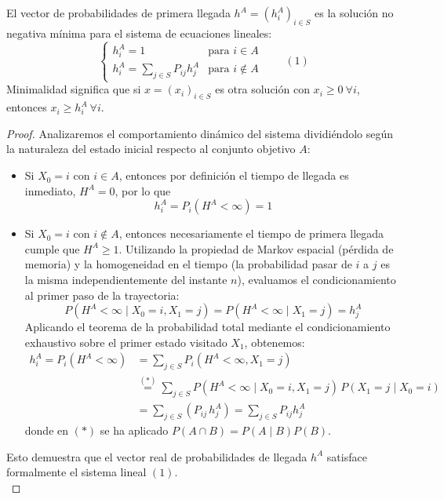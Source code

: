 \documentclass[10pt]{book}
\begin{document}
\begin{teo}
    El vector de probabilidades de primera llegada $h^A = (h_i^A)_{i \in S}$ es la solución no negativa mínima para el sistema de ecuaciones lineales:
    \[
    \begin{cases} 
        h_i^A = 1 & \text{para } i \in A \\ 
        h_i^A = \sum\limits_{j \in S} P_{ij} h_j^A & \text{para } i \notin A 
    \end{cases} \qquad (1)
    \]
    Minimalidad significa que si $x = (x_i)_{i \in S}$ es otra solución con $x_i \geq 0 \ \forall i$, entonces $x_i \geq h_i^A \ \forall i$.
\begin{proof}
    Analizaremos el comportamiento dinámico del sistema dividiéndolo según la naturaleza del estado inicial respecto al conjunto objetivo $A$:
    \begin{itemize}
        \item Si $X_0 = i$ con $i \in A$, entonces por definición el tiempo de llegada es inmediato, $H^A = 0$, por lo que 
        $$h_i^A = P_i(H^A < \infty) = 1$$
        \item Si $X_0 = i$ con $i \notin A$, entonces necesariamente el tiempo de primera llegada cumple que $H^A \geq 1$. Utilizando la propiedad de Markov espacial (pérdida de memoria) y la homogeneidad en el tiempo (la probabilidad pasar de $i$ a $j$ es la misma independientemente del instante $n$), evaluamos el condicionamiento al primer paso de la trayectoria:
        \[ 
        P(H^A < \infty \mid X_0 = i, X_1 = j) = P(H^A < \infty \mid X_1 = j) = h_j^A
        \]
        \noindent
        Aplicando el teorema de la probabilidad total mediante el condicionamiento exhaustivo sobre el primer estado visitado $X_1$, obtenemos:
        \begin{align*}
            h_i^A = P_i(H^A < \infty) &= \sum_{j \in S} P_i(H^A < \infty, X_1 = j) \\
            &\overset{(*)}{=} \sum_{j \in S} P(H^A < \infty \mid X_0 = i, X_1 = j) \, P(X_1 = j \mid X_0 = i) \\
            &= \sum_{j \in S} (P_{ij} \, h_j^A) = \sum_{j \in S} P_{ij} h_j^A
        \end{align*}
        donde en $(*)$ se ha aplicado $P(A \cap B) = P(A \mid B)P(B)$.
    \end{itemize}
    Esto demuestra que el vector real de probabilidades de llegada $h^A$ satisface formalmente el sistema lineal $(1)$. \\


\end{proof}
\end{teo}
\end{document}
